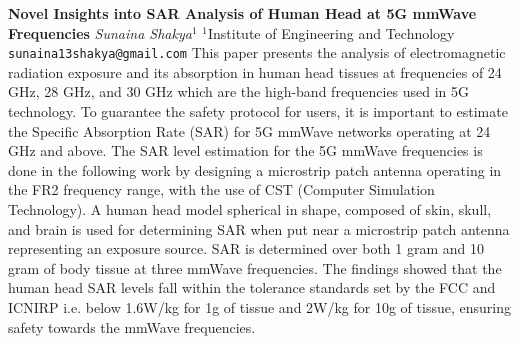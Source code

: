
    \begin{conf-abstract}[]
        {\textbf{Novel Insights into SAR Analysis of Human Head at 5G mmWave Frequencies }}
        {\textit{Sunaina Shakya$^{1}$}}
        {$^{1}$Institute of Engineering and Technology}
        {\texttt{sunaina13shakya@gmail.com}}
        {This paper presents the analysis of electromagnetic radiation exposure and its absorption in human head tissues at frequencies of 24 GHz, 28 GHz, and 30 GHz which are the high-band frequencies used in 5G technology. To guarantee the safety protocol for users, it is important to estimate the Specific Absorption Rate (SAR) for 5G mmWave networks operating at 24 GHz and above. The SAR level estimation for the 5G mmWave frequencies is done in the following work by designing a microstrip patch antenna operating in the FR2 frequency range, with the use of CST (Computer Simulation Technology). A human head model spherical in shape, composed of skin, skull, and brain is used for determining SAR when put near a microstrip patch antenna representing an exposure source. SAR is determined over both 1 gram and 10 gram of body tissue at three mmWave frequencies. The findings showed that the human head SAR levels fall within the tolerance standards set by the FCC and ICNIRP i.e. below 1.6W/kg for 1g of tissue and 2W/kg for 10g of tissue, ensuring safety towards the mmWave frequencies.}
    \end{conf-abstract}
        